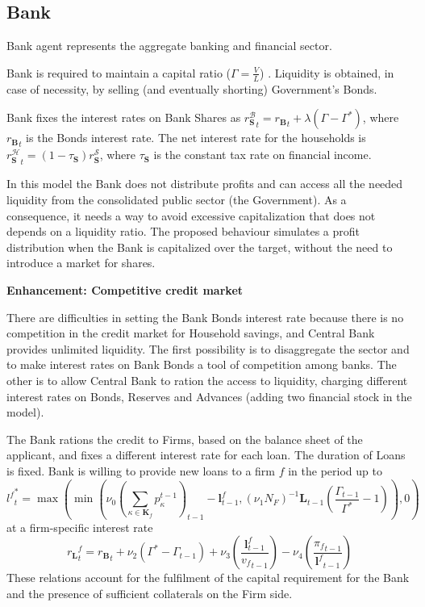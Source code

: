 \documentclass[a4paper, headings=standardclasses]{scrartcl}
\newenvironment{enh}[1][]{\begin{framed}\noindent\textbf{Enhancement: #1}\par}{\end{framed}}
\begin{document}
\subsection{Bank}
Bank agent represents the aggregate banking and financial sector.

Bank is required to maintain a capital ratio ($\Gamma = \frac{V}{L}$) \parencite[see][]{caiani2016}. Liquidity is obtained, in case of necessity, by selling (and eventually shorting) Government's Bonds.

Bank fixes the interest rates on Bank Shares as ${r_\mathbf{S}^\mathcal{B}}_t = {r_\mathbf{B}}_t + \lambda(\Gamma - \Gamma^*)$, where ${r_\mathbf{B}}_t$ is the Bonds interest rate. The net interest rate for the households is ${r^\mathcal{H}_\mathbf{S}}_t = (1-\tau_\mathbf{S}) r^\mathcal{S}_\mathbf{S}$, where $\tau_\mathbf{S}$ is the constant tax rate on financial income.

In this model the Bank does not distribute profits and can access all the needed liquidity from the consolidated public sector (the Government). As a consequence, it needs a way to avoid excessive capitalization that does not depends on a liquidity ratio. The proposed behaviour simulates a profit distribution when the Bank is capitalized over the target, without the need to introduce a market for shares.

\begin{enh}[Competitive credit market]
    There are difficulties in setting the Bank Bonds interest rate because there is no competition in the credit market for Household savings, and Central Bank provides unlimited liquidity.
    The first possibility is to disaggregate the sector and to make interest rates on Bank Bonds a tool of competition among banks.
    The other is to allow Central Bank to ration the access to liquidity, charging different interest rates on Bonds, Reserves and Advances (adding two financial stock in the model).
\end{enh}

The Bank rations the credit to Firms, based on the balance sheet of the applicant, and fixes a different interest rate for each loan. The duration of Loans is fixed.
Bank is willing to provide new loans to a firm $f$ in the period up to $${l^f}^*_t = \max(\min(\nu_0 (\sum_{\kappa \in \mathbf{K}_f} p^{t-1}_\kappa)_{t-1} - \mathbf{l}^f_{t-1}, (\nu_1 N_F)^{-1} \mathbf{L}_{t-1} (\frac{\Gamma_{t-1}}{\Gamma^*}-1)),0)$$ at a firm-specific interest rate $${r_\mathbf{L}}^f_t = {r_\mathbf{B}}_t + \nu_2 (\Gamma^* - \Gamma_{t-1}) + \nu_3 (\frac{\mathbf{l}^f_{t-1}}{{v_f}_{t-1}}) - \nu_4 (\frac{{\pi_f}_{t-1}}{{\mathbf{l}^f}_{t-1}})$$
These relations account for the fulfilment of the capital requirement for the Bank and the presence of sufficient collaterals on the Firm side.
\end{document}
